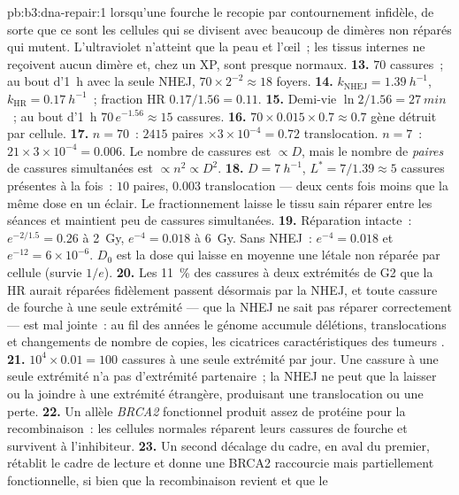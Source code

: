 \begin{solution}{pb:b3:dna-repair:1}
lorsqu'une fourche le recopie par contournement infidèle, de sorte que
ce sont les cellules qui se divisent avec beaucoup de dimères non
réparés qui mutent. L'ultraviolet n'atteint que la peau et l'œil~; les
tissus internes ne reçoivent aucun dimère et, chez un XP, sont presque
normaux.
\textbf{13.} $70$ cassures~; au bout d'\qty{1}{h} avec la seule NHEJ,
$70\times
2^{-2} \approx 18$ foyers.
\textbf{14.} $k_{\text{NHEJ}} = \qty{1.39}{h^{-1}}$, $k_{\text{HR}} =
\qty{0.17}{h^{-1}}$~; fraction HR $0.17/1.56 = 0.11$.
\textbf{15.} Demi-vie $\ln 2/1.56 = \qty{27}{min}$~; au bout
d'\qty{1}{h} $70\,e^{-1.56} \approx 15$ cassures.
\textbf{16.} $70\times 0.015\times 0.7 \approx 0.7$ gène détruit par
cellule.
\textbf{17.} $n = 70$~: $2415$ paires $\times 3\times 10^{-4} = 0.72$
translocation. $n = 7$~: $21\times 3\times 10^{-4} = 0.006$. Le nombre
de cassures est $\propto D$, mais le nombre de \emph{paires} de
cassures simultanées est $\propto n^{2} \propto D^{2}$.
\textbf{18.} $D = \qty{7}{h^{-1}}$, $L^{*} = 7/1.39 \approx 5$ cassures
présentes à la fois~: $10$ paires, $0.003$ translocation --- deux cents
fois moins que la même dose en un éclair. Le fractionnement laisse le
tissu sain réparer entre les séances et maintient peu de cassures
simultanées.
\textbf{19.} Réparation intacte~: $e^{-2/1.5} = 0.26$ à \qty{2}{Gy},
$e^{-4} = 0.018$ à \qty{6}{Gy}. Sans NHEJ~: $e^{-4} = 0.018$ et
$e^{-12} = 6\times 10^{-6}$. $D_{0}$ est la dose qui laisse en moyenne
une  létale non réparée par cellule (survie $1/e$).
\textbf{20.} Les \qty{11}{\%} des cassures à deux extrémités de G2 que
la HR aurait réparées fidèlement passent désormais par la NHEJ, et
toute cassure de fourche à une seule extrémité --- que la NHEJ ne sait
pas réparer correctement --- est mal jointe~: au fil des années le
génome accumule délétions, translocations et changements de nombre de
copies, les cicatrices caractéristiques des tumeurs \emph{}.
\textbf{21.} $10^{4}\times 0.01 = 100$ cassures à une seule extrémité
par jour. Une cassure à une seule extrémité n'a pas d'extrémité
partenaire~; la NHEJ ne peut que la laisser ou la joindre à une
extrémité étrangère, produisant une translocation ou une perte.
\textbf{22.} Un allèle \emph{BRCA2} fonctionnel produit assez de
protéine pour la recombinaison~: les cellules normales réparent leurs
cassures de fourche et survivent à l'inhibiteur.
\textbf{23.} Un second décalage du cadre, en aval du premier, rétablit
le cadre de lecture et donne une BRCA2 raccourcie mais partiellement
fonctionnelle, si bien que la recombinaison revient et que le

\end{solution}
